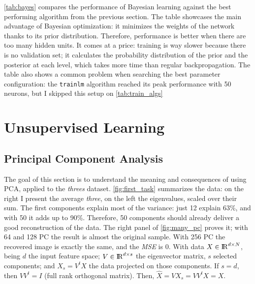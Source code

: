 \documentclass[a4paper, 10pt]{article}
\begin{document}
    \autoref{tab:bayes} compares the performance of Bayesian learning against the 
    best performing algorithm from the previous section. The table showcases the
    main advantage of Bayesian optimization: it minimizes the weights of the
    network thanks to its prior distribution. Therefore, performance is better
    when there are too many hidden units. It comes at a price: training is way slower
    because there is no validation set; it calculates the probability distribution
    of the prior and the posterior at each level, which takes more time than regular
    backpropagation. The table also shows a common problem when searching the best
    parameter configuration: the \texttt{trainlm} algorithm reached its peak 
    performance with 50 neurons, but I skipped this setup on \autoref{tab:train_algs}




  





\newpage
\section{Unsupervised Learning}
  \subsection{Principal Component Analysis}
  The goal of this section is to understand the meaning and consequences of using
  PCA, applied to the \emph{threes} dataset. \autoref{fig:first_task} summarizes the data:
  on the right I present the average \emph{three}, on the left the eigenvalues, 
  scaled over their sum. The first components explain most of the variance:
  just 12 explain 63\%, and with 50 it adds up to 90\%. Therefore, 50 components 
  should already deliver a good reconstruction of the data. The right panel
  of \autoref{fig:many_pc} proves it; with 64 and 128 PC the result
  is almost the original sample. With 256 PC the recovered image is exactly
  the same, and the \emph{MSE} is 0. With data $X \in {\rm I\!R}^{d \times N}$,
  being $d$ the input feature space; $V \in {\rm I\!R}^{d \times s}$ the
  eigenvector matrix, $s$ selected components; and $X_s=V^{t}X$ the data
  projected on those components. If $s=d$, then $VV^{t}=I$ (full rank orthogonal matrix).
  Then, $\hat{X} = VX_s = VV^{t}X = X$. 
  
\end{document}
